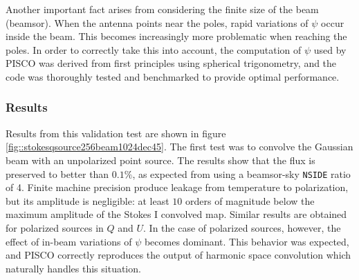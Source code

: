 \documentclass[a4paper,fleqn]{cas-dc}\sloppy
\begin{document}
	Another important fact arises from considering the finite size of the beam (beamsor). When the antenna points near the poles, rapid variations of $\psi$ occur inside the beam. This becomes increasingly more problematic when reaching the poles. In order to correctly take this into account, the computation of $\psi$ used by PISCO was derived from first principles using spherical trigonometry, and the code was thoroughly tested and benchmarked to provide optimal performance. 
	
	\subsubsection{Results}
	
	Results from this validation test are shown in figure \ref{fig::stokesqsource256beam1024dec45}. The first test was to convolve the Gaussian beam with an unpolarized point source. The results show that the flux is preserved to better than $0.1\%$, as expected from using a beamsor-sky \texttt{NSIDE} ratio of 4. Finite machine precision produce leakage from temperature to polarization, but its amplitude is negligible: at least $10$ orders of magnitude below the maximum amplitude of the Stokes I convolved map. Similar results are obtained for polarized sources in $Q$ and $U$. In the case of polarized sources, however, the effect of in-beam variations of $\psi$ becomes dominant. This behavior was expected, and PISCO correctly reproduces the output of harmonic space convolution which naturally handles this situation.
	
\end{document}
